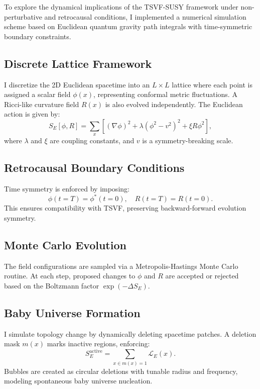 \documentclass[twocolumn,superscriptaddress,floatfix]{revtex4-2}
\begin{document}
To explore the dynamical implications of the TSVF-SUSY framework under non-perturbative and retrocausal conditions, I implemented a numerical simulation scheme based on Euclidean quantum gravity path integrals with time-symmetric boundary constraints.

\subsection{Discrete Lattice Framework}
I discretize the 2D Euclidean spacetime into an $L \times L$ lattice where each point is assigned a scalar field $\phi(x)$, representing conformal metric fluctuations. A Ricci-like curvature field $R(x)$ is also evolved independently. The Euclidean action is given by:
\begin{equation}
S_E[\phi, R] = \sum_{x} \left[ (\nabla \phi)^2 + \lambda (\phi^2 - v^2)^2 + \xi R \phi^2 \right],
\end{equation}
where $\lambda$ and $\xi$ are coupling constants, and $v$ is a symmetry-breaking scale.

\subsection{Retrocausal Boundary Conditions}
Time symmetry is enforced by imposing:
\begin{equation}
\phi(t = T) = \phi^*(t = 0), \quad R(t = T) = R(t = 0).
\end{equation}
This ensures compatibility with TSVF, preserving backward-forward evolution symmetry.

\subsection{Monte Carlo Evolution}
The field configurations are sampled via a Metropolis-Hastings Monte Carlo routine. At each step, proposed changes to $\phi$ and $R$ are accepted or rejected based on the Boltzmann factor $\exp(-\Delta S_E)$.

\subsection{Baby Universe Formation}
I simulate topology change by dynamically deleting spacetime patches. A deletion mask $m(x)$ marks inactive regions, enforcing:
\begin{equation}
S_E^{\text{active}} = \sum_{x \in m(x)=1} \mathcal{L}_E(x).
\end{equation}
Bubbles are created as circular deletions with tunable radius and frequency, modeling spontaneous baby universe nucleation.
\end{document}
